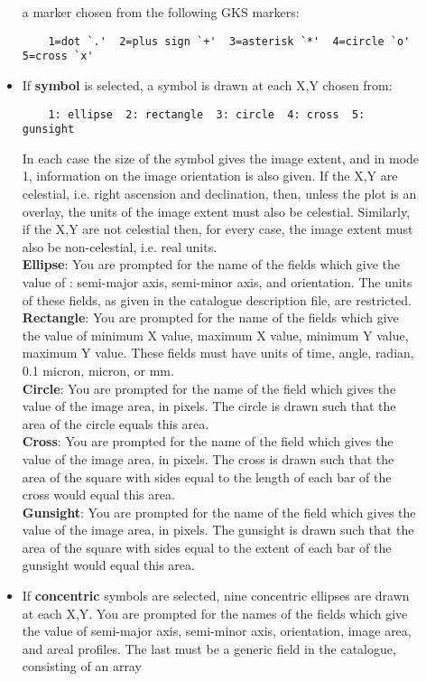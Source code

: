 \begin{description}
\begin{itemize}
a marker chosen from the following GKS markers:
\begin{verbatim}
    1=dot `.'  2=plus sign `+'  3=asterisk `*'  4=circle `o'  5=cross `x'
\end{verbatim}
\item If {\bf symbol} is selected, a symbol is drawn at each X,Y chosen from:
\begin{verbatim}
    1: ellipse  2: rectangle  3: circle  4: cross  5: gunsight
\end{verbatim}
In each case the size of the symbol gives the image extent, and in
mode 1, information on the image orientation is also given.
If the X,Y are celestial, i.e. right ascension and declination, then,
unless the plot is an overlay, the units of the image extent must also be
celestial.
Similarly, if the X,Y are not celestial then, for every case, the image
extent must also be non-celestial, i.e. real units.\\
{\bf Ellipse}: You are prompted for the name of the fields which give
the value of : semi-major axis, semi-minor axis, and orientation.
The units of these fields, as given in the catalogue description
file, are restricted.\\
{\bf Rectangle}: You are prompted for the name of the fields which
give the value of minimum X value, maximum X value, minimum Y
value, maximum Y value.
These fields must have units of time, angle, radian, 0.1 micron, micron,
or mm.\\
{\bf Circle}: You are prompted for the name of the field which
gives the value of the image area, in pixels.
The circle is drawn such that the area of the circle equals this area.\\
{\bf Cross}: You are prompted for the name of the field which gives
the value of the image area, in pixels.
The cross is drawn such that the area of the square with sides equal to
the length of each bar of the cross would equal this area.\\
{\bf Gunsight}: You are prompted for the name of the field which gives
the value of the image area, in pixels.
The gunsight is drawn such that the area of the square with sides equal
to the extent of each bar of the gunsight would equal this area.
\item If {\bf concentric} symbols are selected, nine concentric ellipses
are drawn at each X,Y.
You are prompted for the names of the fields which give the value of
semi-major axis, semi-minor axis, orientation, image area, and areal
profiles.
The last must be a generic field in the catalogue, consisting of an array

\end{itemize}
\end{description}
